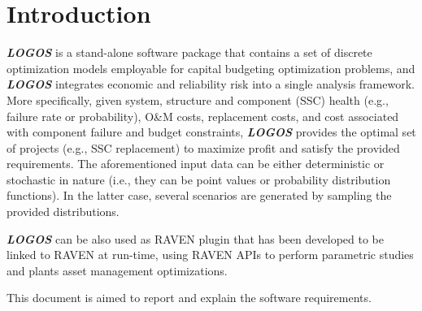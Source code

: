\section{Introduction}

\textbf{\textit{LOGOS}} is a stand-alone software package that contains a set of discrete
optimization models employable for capital budgeting optimization
problems, and \textbf{\textit{LOGOS}} integrates economic and reliability risk into a single
analysis framework. More specifically,  given system, structure and component
(SSC) health (e.g., failure rate or probability), O\&M costs, replacement costs, and cost
associated with component failure and budget constraints, \textbf{\textit{LOGOS}} provides the optimal set
of projects (e.g., SSC replacement) to maximize profit and satisfy the provided requirements.
The aforementioned input data can be either deterministic or stochastic in nature
(i.e., they can be point values or probability distribution functions). In the latter case,
several scenarios are generated by sampling the provided distributions.

\textbf{\textit{LOGOS}} can be also used as RAVEN plugin that has been developed to be linked
to RAVEN at run-time, using RAVEN APIs to perform parametric studies and plants
asset management optimizations.

This document is aimed to report and explain the software requirements.
